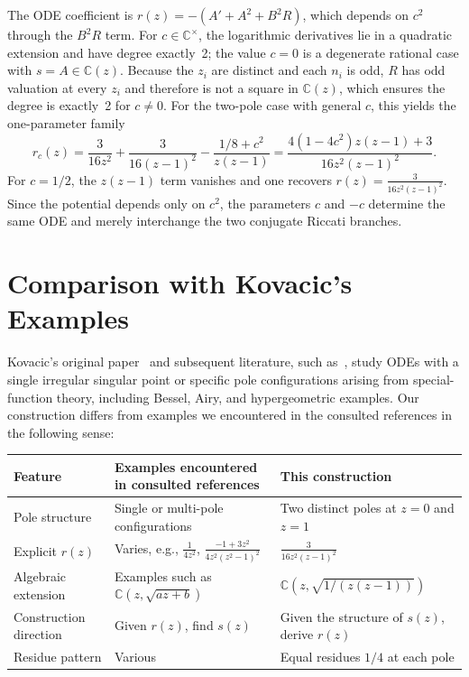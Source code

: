 \documentclass[11pt,a4paper]{article}
\theoremstyle{definition}
\begin{document}
The ODE coefficient is \(r(z) = -(A' + A^2 + B^2R)\), which depends on \(c^2\) through the \(B^2R\) term. For \(c \in \mathbb{C}^{\times}\), the logarithmic derivatives lie in a quadratic extension and have degree exactly~2; the value \(c=0\) is a degenerate rational case with \(s=A\in\mathbb{C}(z)\). Because the \(z_i\) are distinct and each \(n_i\) is odd, \(R\) has odd valuation at every \(z_i\) and therefore is not a square in \(\mathbb{C}(z)\), which ensures the degree is exactly~2 for \(c\neq 0\). For the two-pole case with general \(c\), this yields the one-parameter family
\begin{equation}
r_c(z) = \frac{3}{16z^2} + \frac{3}{16(z-1)^2} - \frac{1/8 + c^2}{z(z-1)} = \frac{4(1-4c^2)z(z-1) + 3}{16z^2(z-1)^2}.
\end{equation}
For \(c=1/2\), the \(z(z-1)\) term vanishes and one recovers \(r(z) = \frac{3}{16z^2(z-1)^2}\). Since the potential depends only on \(c^2\), the parameters \(c\) and \(-c\) determine the same ODE and merely interchange the two conjugate Riccati branches.

\section{Comparison with Kovacic's Examples}

Kovacic's original paper~\cite{kovacic1986} and subsequent literature, such as~\cite{vanderput2003, singer1991}, study ODEs with a single irregular singular point or specific pole configurations arising from special-function theory, including Bessel, Airy, and hypergeometric examples. Our construction differs from examples we encountered in the consulted references in the following sense:

\begin{center}
\begin{tabular}{|l|p{6cm}|p{6cm}|}
\hline
\textbf{Feature} & \textbf{Examples encountered in consulted references} & \textbf{This construction} \\
\hline
Pole structure & Single or multi-pole configurations & Two distinct poles at \(z=0\) and \(z=1\) \\
\hline
Explicit \(r(z)\) & Varies, e.g., \(\frac{1}{4z^2}\), \(\frac{-1+3z^2}{4z^2(z^2-1)^2}\) & \(\frac{3}{16z^2(z-1)^2}\) \\
\hline
Algebraic extension & Examples such as \(\mathbb{C}(z, \sqrt{az+b})\) & \(\mathbb{C}(z, \sqrt{1/(z(z-1))})\) \\
\hline
Construction direction & Given \(r(z)\), find \(s(z)\) & Given the structure of \(s(z)\), derive \(r(z)\) \\
\hline
Residue pattern & Various & Equal residues \(1/4\) at each pole \\
\hline
\end{tabular}
\end{center}
\end{document}

